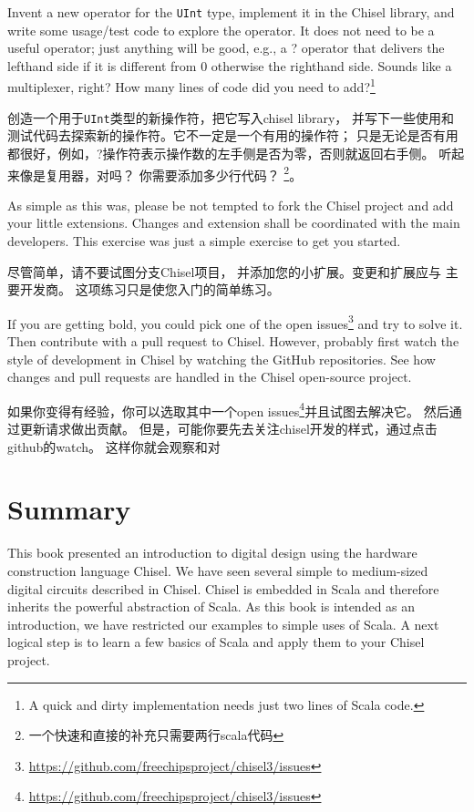 \documentclass[%
    10pt,
    headinclude, footexclude,
    openright, %
    notitlepage,
    cleardoubleempty,
    headsepline,
    pointlessnumbers,
    bibtotoc, idxtotoc,
    ]{scrbook}
\newcommand{\code}[1]{{\small{\texttt{#1}}}}
\newcommand{\myref}[2]{\href{#1}{#2}}
\renewcommand{\myref}[2]{{#2}{\footnote{\url{#1}}}}
\begin{document}
{Invent a new operator for the \code{UInt} type, implement it in the Chisel library,
and write some usage/test code to explore the operator. It does not need to be
a useful operator; just anything will be good, e.g., a ? operator that delivers the lefthand side
if it is different from 0 otherwise the righthand side. Sounds like a multiplexer, right?
How many lines of code did you need to add?\footnote{A quick and dirty implementation
needs just two lines of Scala code.}

创造一个用于\code{UInt}类型的新操作符，把它写入chisel library，
并写下一些使用和测试代码去探索新的操作符。它不一定是一个有用的操作符；
只是无论是否有用都很好，例如，?操作符表示操作数的左手侧是否为零，否则就返回右手侧。
听起来像是复用器，对吗？
你需要添加多少行代码？
\footnote{一个快速和直接的补充只需要两行scala代码}。


As simple as this was, please be not tempted to fork the Chisel project and
add your little extensions. Changes and extension shall be coordinated with the
main developers.
This exercise was just a simple exercise to get you started.


尽管简单，请不要试图分支Chisel项目，
并添加您的小扩展。变更和扩展应与
主要开发商。
这项练习只是使您入门的简单练习。

If you are getting bold, you could pick one of the
\myref{https://github.com/freechipsproject/chisel3/issues}{open issues} and try to solve it.
Then contribute with a pull request to Chisel.
However, probably first watch the style of development in Chisel by watching the GitHub
repositories.
See how changes and pull requests are handled in the Chisel open-source project.

如果你变得有经验，你可以选取其中一个\myref{https://github.com/freechipsproject/chisel3/issues}{open issues}并且试图去解决它。
然后通过更新请求做出贡献。
但是，可能你要先去关注chisel开发的样式，通过点击github的watch。
这样你就会观察和对


\chapter{Summary}
\label{sec:conclusion}

This book presented an introduction to digital design using the
hardware construction language Chisel.
We have seen several simple to medium-sized digital circuits
described in Chisel.
Chisel is embedded in Scala and therefore inherits the powerful
abstraction of Scala.
As this book is intended as an introduction, we have restricted
our examples to simple uses of Scala.
A next logical step is to learn a few basics of Scala and apply them
to your Chisel project.

}
\end{document}
